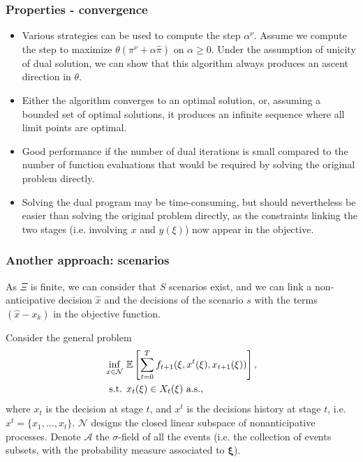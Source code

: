 \documentclass{beamer}
\def\bxi{\boldsymbol\xi}
\begin{document}
\begin{frame}
\frametitle{Properties - convergence}

\begin{itemize}
\item
Various strategies can be used to compute the step $\alpha^\nu$. Assume we compute the step to maximize $\theta(\pi^{\nu}+\alpha\hat{\pi})$ on $\alpha \geq 0$.
Under the assumption of unicity of dual solution, we can show that this algorithm always produces an {\blue ascent direction} in $\theta$.
\item
Either the algorithm converges to an optimal solution, or, assuming a bounded set of optimal solutions, it produces an infinite sequence where all limit points are optimal.
\item
Good performance if the number of dual iterations is small compared to the number of function evaluations that would be required by solving the original problem directly.
\item
Solving the dual program may be time-consuming, but should nevertheless be easier than solving the original problem directly, as the constraints linking the two stages (i.e. involving $x$ and $y(\xi)$) now appear in the objective.
\end{itemize}

\end{frame}

\begin{frame}

\frametitle{Another approach: scenarios}

As $\Xi$ is finite, we can consider that $S$ scenarios exist, and we can link a non-anticipative decision $\hat{x}$ and the decisions of the scenario $s$ with the terms $(\hat{x}-x_k)$ in the objective function.

\mbox{}

Consider the general problem
\begin{align*}
\inf_{x \in \mathcal{N}}\ & {\mathbb{E}} \left[ \sum_{t=0}^T f_{t+1}(\xi, x^t(\xi),
x_{t+1}(\xi)) \right], \\
\mbox{s.t. } & x_t(\xi) \in X_t(\xi) \mbox{ a.s.},
\end{align*}
where $x_t$ is the decision at stage $t$, and $x^t$ is the decisions history at stage $t$, i.e. $x^t = \lbrace x_1,\ldots, x_t \rbrace$.
$\mathcal{N}$ designs the closed linear subspace of nonanticipative processes.
Denote $\mathcal{A}$ the $\sigma$-field of all the events (i.e. the collection of events subsets, with the probability measure associated to $\bxi$).

\end{frame}
\end{document}
